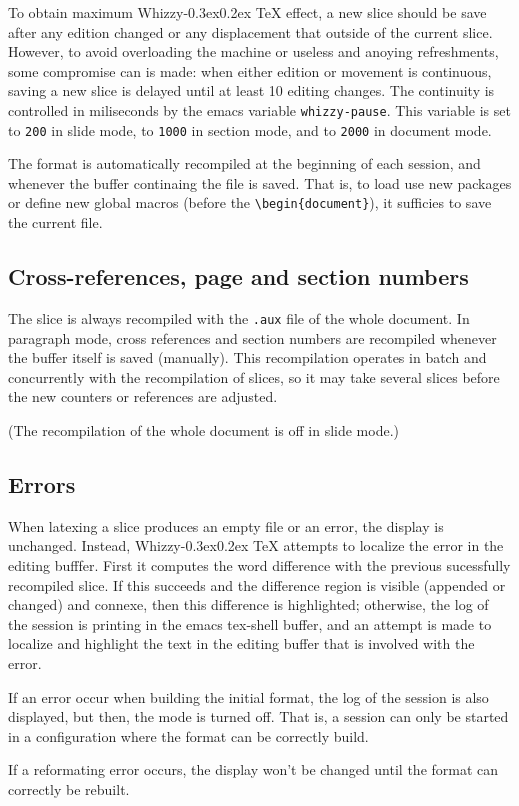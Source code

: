 \documentclass{article}
\let \lst \verb
\def \whizzy{{Whizzy\kern -0.3ex\raise 0.2ex \hbox{\TeX}}}
\begin{document}
To obtain maximum {\whizzy} effect, a new slice should be save after any
edition changed or any displacement that outside of the current slice.
However, to avoid overloading the machine or useless and anoying
refreshments, some compromise can is made: when either edition or movement
is continuous, saving a new slice is delayed until at least 10 editing
changes. The continuity is controlled in miliseconds by the emacs variable
\lst"whizzy-pause". This variable is set to \lst"200" in slide
mode, to \lst"1000" in section mode, and to \lst"2000" in document mode.

The format is automatically recompiled at the beginning of each session, and
whenever the buffer continaing the file is saved. That is, to load use new
packages or define new global macros (before the \lst"\begin{document}"), it
sufficies to save the current file.

\subsection {Cross-references, page and section numbers} 

The slice is always recompiled with the \lst".aux" file of the whole
document.  In paragraph mode, cross references and section numbers are 
recompiled whenever the buffer itself is saved (manually). 
This recompilation operates in batch and concurrently with the recompilation
of slices, so it may take several slices before the new counters or
references are adjusted.

(The recompilation of the whole document is off in slide mode.) 


\subsection {Errors} 

When  latexing a slice produces an empty file or an error, the display is
unchanged. Instead, {\whizzy} attempts to localize the error in the editing
bufffer. First it computes the word difference with the previous sucessfully
recompiled slice. If this succeeds and the difference region is visible
(appended or changed) and connexe, then this difference  is highlighted;
otherwise, the log of the session is printing in the emacs tex-shell buffer, 
and an attempt is made to localize and highlight the text in the editing
buffer that is involved with the error.


If an error occur when building the initial format, the log of the session
is also displayed, but then, the mode is turned off. That is, a session can
only be started in a configuration where the format can be correctly build. 

If a reformating error occurs, the display won't be changed until the format
can correctly be rebuilt.
\end{document}

